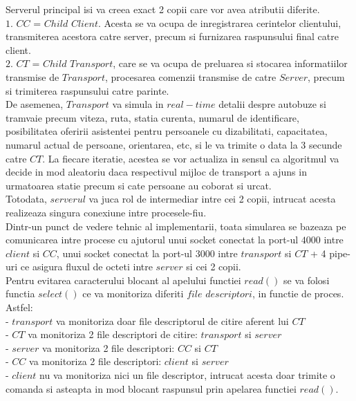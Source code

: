 \documentclass{llncs}
\begin{document}
Serverul principal isi va creea exact 2 copii care vor avea atributii diferite.\\
$1.$ $CC$ = $Child$ $Client$. Acesta se va ocupa de inregistrarea cerintelor clientului, transmiterea acestora catre server, precum si furnizarea raspunsului final catre client.\\
$2.$ $CT$ = $Child$ $Transport$, care se va ocupa de preluarea si stocarea informatiilor transmise de $Transport$, procesarea comenzii transmise de catre $Server$, precum si trimiterea raspunsului catre parinte.\\
\hspace*{4mm} De asemenea, $Transport$ va simula in $real-time$ detalii despre autobuze si tramvaie precum viteza, ruta, statia curenta, numarul de identificare, posibilitatea oferirii asistentei pentru persoanele cu dizabilitati, capacitatea, numarul actual de persoane, orientarea, etc, si le va trimite o data la 3 secunde catre $CT$. La fiecare iteratie, acestea se vor actualiza in sensul ca algoritmul va decide in mod aleatoriu daca respectivul mijloc de transport a ajuns in urmatoarea statie precum si cate persoane au coborat si urcat.\\
\hspace*{4mm} Totodata, $serverul$ va juca rol de intermediar intre cei 2 copii, intrucat acesta realizeaza singura conexiune intre procesele-fiu.\\
\hspace*{4mm} Dintr-un punct de vedere tehnic al implementarii, toata simularea se bazeaza pe comunicarea intre procese cu ajutorul unui socket conectat la port-ul $4000$ intre $client$ si $CC$, unui socket conectat la port-ul $3000$ intre $transport$ si $CT$ + 4 pipe-uri ce asigura fluxul de octeti intre $server$ si cei 2 copii. \\
\hspace*{4mm} Pentru evitarea caracterului blocant al apelului functiei $read()$ se va folosi functia $select()$ ce va monitoriza diferiti $file$ $descriptori$, in functie de proces. Astfel: \\
- $transport$ va monitoriza doar file descriptorul de citire aferent lui $CT$ \\
- $CT$ va monitoriza 2 file descriptori de citire: $transport$ si $server$ \\
- $server$ va monitoriza 2 file descriptori: $CC$ si $CT$\\
- $CC$ va monitoriza 2 file descriptori: $client$ si $server$\\
- $client$ nu va monitoriza nici un file descriptor, intrucat acesta doar trimite o comanda si asteapta in mod blocant raspunsul prin apelarea functiei $read()$.
\end{document}
